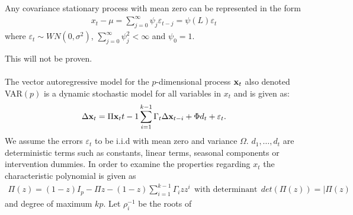 \chapter{}
\begin{setn}[Appendix]\label{setn:Wold}
    Any covariance stationary process with mean zero can be represented in the form
    \begin{align*}
        x_t-\mu=\sum^\infty_{j=0}\psi_j\varepsilon_{t-j}=\psi(L)\varepsilon_t
    \end{align*}
    where $\varepsilon_t\sim WN(0,\sigma^2)$, $\sum^\infty_{j=0}\psi^2_j<\infty$ and $\psi_0=1$.
\end{setn}
This will not be proven.\\\\
The vector autoregressive model for the $p$-dimensional process $\textbf{x}_t$ also denoted VAR$(p)$ is a dynamic stochastic model for all variables in $x_t$ and is given as:
\begin{align*}
    \Delta\textbf{x}_t=\Pi\textbf{x}_t{t-1}\sum^{k-1}_{i=1}\Gamma_t\Delta\textbf{x}_{t-i}+\Phi d_t+\varepsilon_t.
\end{align*}
We assume the errors $\varepsilon_t$ to be i.i.d with mean zero and variance $\Omega$. $d_1,\ldots,d_t$ are deterministic terms such as constants, linear terms, seasonal components or intervention dummies. In order to examine the properties regarding $x_t$ the characteristic polynomial is given as
\begin{align*}
    \Pi(z)=(1-z)I_p-\Pi z-(1-z)\sum^{k-1}_{i=1}\Gamma_iz z^i \:\:\text{with determinant}\:\: det(\Pi(z))=|\Pi(z)
\end{align*}
and degree of maximum $kp$. Let $\rho_i^{-1}$ be the roots of\\
\pause




\chapter{}\label{app:Var_estimations}

